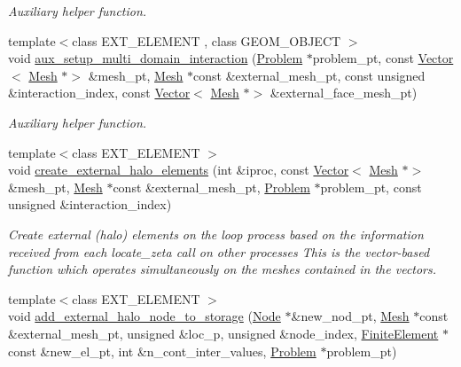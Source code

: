 \begin{DoxyCompactItemize}
\begin{DoxyCompactList}\small\item\em Auxiliary helper function. \end{DoxyCompactList}\item 
{\footnotesize template$<$class E\+X\+T\+\_\+\+E\+L\+E\+M\+E\+NT , class G\+E\+O\+M\+\_\+\+O\+B\+J\+E\+CT $>$ }\\void \hyperlink{namespaceoomph_1_1Multi__domain__functions_a8b31c549df27f7cf183bfb28faf375ce}{aux\+\_\+setup\+\_\+multi\+\_\+domain\+\_\+interaction} (\hyperlink{classoomph_1_1Problem}{Problem} $\ast$problem\+\_\+pt, const \hyperlink{classoomph_1_1Vector}{Vector}$<$ \hyperlink{classoomph_1_1Mesh}{Mesh} $\ast$$>$ \&mesh\+\_\+pt, \hyperlink{classoomph_1_1Mesh}{Mesh} $\ast$const \&external\+\_\+mesh\+\_\+pt, const unsigned \&interaction\+\_\+index, const \hyperlink{classoomph_1_1Vector}{Vector}$<$ \hyperlink{classoomph_1_1Mesh}{Mesh} $\ast$$>$ \&external\+\_\+face\+\_\+mesh\+\_\+pt)
\begin{DoxyCompactList}\small\item\em Auxiliary helper function. \end{DoxyCompactList}\item 
{\footnotesize template$<$class E\+X\+T\+\_\+\+E\+L\+E\+M\+E\+NT $>$ }\\void \hyperlink{namespaceoomph_1_1Multi__domain__functions_a7d9b0f9da301d95c3442860f127ab2ae}{create\+\_\+external\+\_\+halo\+\_\+elements} (int \&iproc, const \hyperlink{classoomph_1_1Vector}{Vector}$<$ \hyperlink{classoomph_1_1Mesh}{Mesh} $\ast$$>$ \&mesh\+\_\+pt, \hyperlink{classoomph_1_1Mesh}{Mesh} $\ast$const \&external\+\_\+mesh\+\_\+pt, \hyperlink{classoomph_1_1Problem}{Problem} $\ast$problem\+\_\+pt, const unsigned \&interaction\+\_\+index)
\begin{DoxyCompactList}\small\item\em Create external (halo) elements on the loop process based on the information received from each locate\+\_\+zeta call on other processes This is the vector-\/based function which operates simultaneously on the meshes contained in the vectors. \end{DoxyCompactList}\item 
{\footnotesize template$<$class E\+X\+T\+\_\+\+E\+L\+E\+M\+E\+NT $>$ }\\void \hyperlink{namespaceoomph_1_1Multi__domain__functions_a6415c5c0119c75e162418a0c9b59b4f7}{add\+\_\+external\+\_\+halo\+\_\+node\+\_\+to\+\_\+storage} (\hyperlink{classoomph_1_1Node}{Node} $\ast$\&new\+\_\+nod\+\_\+pt, \hyperlink{classoomph_1_1Mesh}{Mesh} $\ast$const \&external\+\_\+mesh\+\_\+pt, unsigned \&loc\+\_\+p, unsigned \&node\+\_\+index, \hyperlink{classoomph_1_1FiniteElement}{Finite\+Element} $\ast$const \&new\+\_\+el\+\_\+pt, int \&n\+\_\+cont\+\_\+inter\+\_\+values, \hyperlink{classoomph_1_1Problem}{Problem} $\ast$problem\+\_\+pt)
$$
\end{DoxyCompactItemize}
